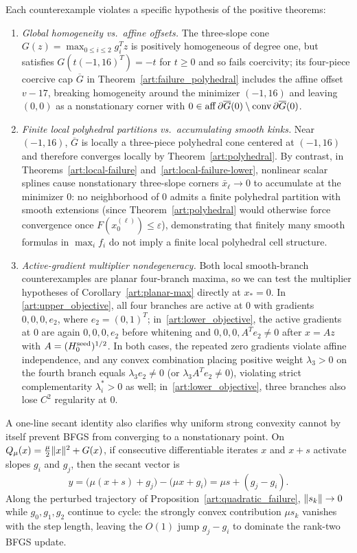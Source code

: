 Each counterexample violates a specific hypothesis of the positive theorems:
\begin{enumerate}
\item \emph{Global homogeneity vs.\ affine offsets.} The three-slope cone
$G(z)=\max_{0\le i\le2}g_i^Tz$ is positively homogeneous of degree one, but
satisfies $G(t(-1,16)^T)=-t$ for $t\ge0$ and so fails coercivity; its four-piece
coercive cap $\overline G$ in Theorem~\ref{art:failure_polyhedral} includes the
affine offset $v-17$, breaking homogeneity around the minimizer $(-1,16)$ and
leaving $(0,0)$ as a nonstationary corner with $0\in\operatorname{aff}\partial\overline G(0)\setminus\operatorname{conv}\partial\overline G(0)$.
\item \emph{Finite local polyhedral partitions vs.\ accumulating smooth kinks.}
Near $(-1,16)$, $\overline G$ is locally a three-piece polyhedral cone centered
at $(-1,16)$ and therefore converges locally by Theorem~\ref{art:polyhedral}.
By contrast, in Theorems~\ref{art:local-failure} and~\ref{art:local-failure-lower},
nonlinear scalar splines cause nonstationary three-slope corners $\bar x_\ell\to0$
to accumulate at the minimizer $0$: no neighborhood of $0$ admits a finite
polyhedral partition with smooth extensions (since Theorem~\ref{art:polyhedral}
would otherwise force convergence once $F(x_0^{(\ell)})\le\varepsilon$),
demonstrating that finitely many smooth formulas in $\max_if_i$ do not imply a
finite local polyhedral cell structure.
\item \emph{Active-gradient multiplier nondegeneracy.} Both local smooth-branch
counterexamples are planar four-branch maxima, so we can test the multiplier
hypotheses of Corollary~\ref{art:planar-max} directly at $x_*=0$. In
\eqref{art:upper_objective}, all four branches are active at $0$ with gradients
$0,0,0,e_2$, where $e_2=(0,1)^T$; in~\eqref{art:lower_objective}, the active
gradients at $0$ are again $0,0,0,e_2$ before whitening and $0,0,0,A^Te_2\ne0$
after $x=Az$ with $A=(H_0^{\rm seed})^{1/2}$. In both cases, the repeated zero
gradients violate affine independence, and any convex combination placing
positive weight $\lambda_3>0$ on the fourth branch equals $\lambda_3e_2\ne0$ (or
$\lambda_3A^Te_2\ne0$), violating strict complementarity $\lambda_i^*>0$ as
well; in~\eqref{art:lower_objective}, three branches also lose $C^2$ regularity
at $0$.
\end{enumerate}

A one-line secant identity also clarifies why uniform strong convexity cannot by
itself prevent BFGS from converging to a nonstationary point. On $Q_\mu(x)=\tfrac\mu2\lVert x\rVert^2+G(x)$,
if consecutive differentiable iterates $x$ and $x+s$ activate slopes $g_i$ and
$g_j$, then the secant vector is
\begin{equation}\label{art:jump-secant}
 y=\bigl(\mu(x+s)+g_j\bigr)-\bigl(\mu x+g_i\bigr)
  =\mu s+(g_j-g_i).
\end{equation}
Along the perturbed trajectory of Proposition~\ref{art:quadratic_failure},
$\lVert s_k\rVert\to0$ while $g_0,g_1,g_2$ continue to cycle: the strongly convex
contribution $\mu s_k$ vanishes with the step length, leaving the $O(1)$ jump
$g_j-g_i$ to dominate the rank-two BFGS update.

